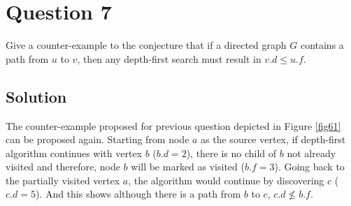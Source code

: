 
\section*{Question 7}

Give a counter-example to the conjecture that if a directed graph $G$ contains a path from $u$ to $v$, then any depth-first search must result in $v.d \leq u.f$.

\subsection*{Solution}

The counter-example proposed for previous question depicted in Figure \ref{fig61} can be proposed again.
Starting from node $a$ as the source vertex, if depth-first algorithm continues with vertex $b$ ($b.d = 2$), there is no child of $b$ not already visited and therefore, node $b$ will be marked as visited ($b.f = 3 $).
Going back to the partially visited vertex $a$, the algorithm would continue by discovering $c$ ($c.d = 5$).
And this shows although there is a path from $b$ to $c$, $c.d \nleq b.f$.
